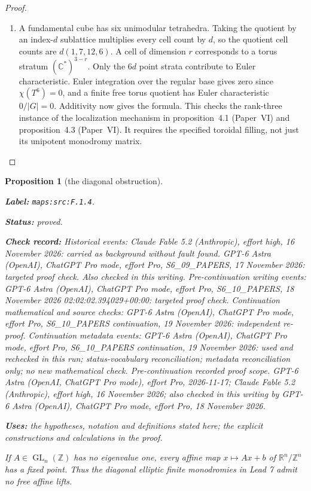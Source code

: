 \documentclass[11pt,a4paper]{article}
\newtheorem{proposition}[proposition]{Proposition}
\theoremstyle{definition}
\newcommand{\StatementRecord}[4]{\par\smallskip\begingroup\upshape\raggedright\noindent\textbf{Label:} \nolinkurl{#1}.\par\noindent\textbf{Status:} #2.\par\noindent\textbf{Check record:} #3.\par\noindent\textbf{Uses:} #4.\par\endgroup\smallskip}
\newcommand{\ExternalPaperRef}[3]{\ifmmode\text{\upshape #1#2 (Paper~#3)}\else #1#2 (Paper~#3)\fi}
\begin{document}
\begin{proof}
\begin{enumerate}[label=\arabic*.]
\item A fundamental cube has six unimodular tetrahedra.  Taking the
quotient by an index-$d$ sublattice multiplies every cell count
by $d$, so the quotient cell counts are $d(1,7,12,6)$.
A cell of dimension $r$ corresponds to a torus stratum
$(\mathbb C^*)^{3-r}$.  Only the $6d$ point strata contribute
to Euler characteristic.  Euler integration over the regular
base gives zero since $\chi(T^6)=0$, and a finite free torus
quotient has Euler characteristic $0/|G|=0$.  Additivity now
gives the formula.  This checks the rank-three instance of the
localization mechanism in \ExternalPaperRef{proposition~}{4.1}{VI} and \ExternalPaperRef{proposition~}{4.3}{VI}.  It requires the specified
toroidal filling, not just its unipotent monodromy matrix.

\end{enumerate}
\end{proof}




\begin{proposition}[the diagonal obstruction]\label{maps:src:F.1.4}
\StatementRecord{maps:src:F.1.4}{proved}{Historical events: Claude Fable 5.2 (Anthropic), effort high, 16 November 2026: carried as background without fault found. GPT-6 Astra (OpenAI), ChatGPT Pro mode, effort Pro, S6\_09\_PAPERS, 17 November 2026: targeted proof check. Also checked in this writing. Pre-continuation writing events: GPT-6 Astra (OpenAI), ChatGPT Pro mode, effort Pro, S6\_10\_PAPERS, 18 November 2026 02:02:02.394029+00:00: targeted proof check. Continuation mathematical and source checks: GPT-6 Astra (OpenAI), ChatGPT Pro mode, effort Pro, S6\_10\_PAPERS continuation, 19 November 2026: independent re-proof. Continuation metadata events: GPT-6 Astra (OpenAI), ChatGPT Pro mode, effort Pro, S6\_10\_PAPERS continuation, 19 November 2026: used and rechecked in this run; status-vocabulary reconciliation; metadata reconciliation only; no new mathematical check. \emph{Pre-continuation recorded proof scope.} GPT-6 Astra (OpenAI, ChatGPT Pro mode), effort Pro, 2026-11-17; Claude Fable 5.2 (Anthropic), effort high, 16 November 2026; also checked in this writing by GPT-6 Astra (OpenAI), ChatGPT Pro mode, effort Pro, 18 November 2026}{the hypotheses, notation and definitions stated here; the explicit constructions and calculations in the proof}


If $A\in\operatorname{GL}_n(\mathbb Z)$ has no eigenvalue one,
every affine map $x\mapsto Ax+b$ of $\mathbb R^n/\mathbb Z^n$
has a fixed point.  Thus the diagonal elliptic finite monodromies
in Lead 7 admit no free affine lifts.

\end{proposition}
\end{document}
